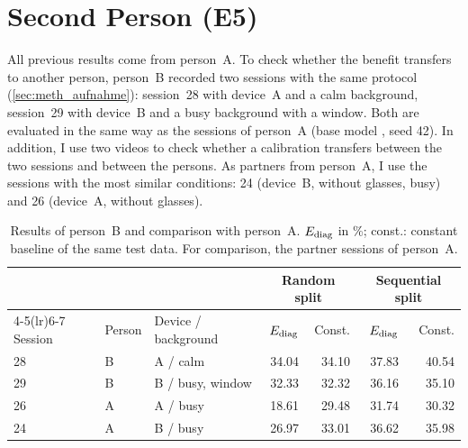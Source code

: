 \section{Second Person (E5)}
\label{sec:person_b}

All previous results come from person~A. To check whether the benefit transfers
to another person, person~B recorded two sessions with the same protocol
(\cref{sec:meth_aufnahme}): session~28 with device~A and a calm background,
session~29 with device~B and a busy background with a window. Both are evaluated
in the same way as the sessions of person~A (base model ,
seed 42). In addition, I use two videos to check whether a calibration transfers
between the two sessions and between the persons. As partners from person~A, I
use the sessions with the most similar conditions: 24 (device~B, without
glasses, busy) and 26 (device~A, without glasses).

\begin{table}[htbp]
  \centering
  \caption[Results of the second person]{Results of person~B and comparison with person~A. $E_{\mathrm{diag}}$
           in \si{\percent}; const.: constant baseline of the same test data.
           For comparison, the partner sessions of person~A.}
  \label{tab:person_b}
  \small
  \begin{tabular}{lll rr rr}
    \toprule
    & & & \multicolumn{2}{c}{Random split} & \multicolumn{2}{c}{Sequential split} \\
    \cmidrule(lr){4-5}\cmidrule(lr){6-7}
    Session & Person & Device / background & $E_{\mathrm{diag}}$ & Const. & $E_{\mathrm{diag}}$ & Const. \\
    \midrule
    28 & B & A / calm               & 34.04 & 34.10 & 37.83 & 40.54 \\
    29 & B & B / busy, window       & 32.33 & 32.32 & 36.16 & 35.10 \\
    \midrule
    26 & A & A / busy               & 18.61 & 29.48 & 31.74 & 30.32 \\
    24 & A & B / busy               & 26.97 & 33.01 & 36.62 & 35.98 \\
    \bottomrule
  \end{tabular}
\end{table}

